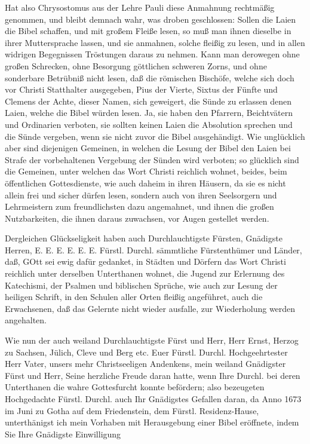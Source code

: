 Hat also Chrysostomus aus der Lehre Pauli diese Anmahnung rechtmäßig genommen, und bleibt demnach wahr, was droben geschlossen: Sollen die Laien die Bibel schaffen, und mit großem Fleiße lesen, so muß man ihnen dieselbe in ihrer Muttersprache lassen, und sie anmahnen, solche fleißig zu lesen, und in allen widrigen Begegnissen Tröstungen daraus zu nehmen. Kann man derowegen ohne großen Schrecken, ohne Besorgung göttlichen schweren Zorns, und ohne sonderbare Betrübniß nicht lesen, daß die römischen Bischöfe, welche sich doch vor Christi Statthalter ausgegeben, Pius der Vierte, Sixtus der Fünfte und Clemens der Achte, dieser Namen, sich geweigert, die Sünde zu erlassen denen Laien, welche die Bibel würden lesen. Ja, sie haben den Pfarrern, Beichtvätern und Ordinarien verboten, sie sollten keinen Laien die Absolution sprechen und die Sünde vergeben, wenn sie nicht zuvor die Bibel ausgehändigt. Wie unglücklich aber sind diejenigen Gemeinen, in welchen die Lesung der Bibel den Laien bei Strafe der vorbehaltenen Vergebung der Sünden wird verboten; so glücklich sind die Gemeinen, unter welchen das Wort Christi reichlich wohnet, beides, beim öffentlichen Gottesdienste, wie auch daheim in ihren Häusern, da sie es nicht allein frei und sicher dürfen lesen, sondern auch von ihren Seelsorgern und Lehrmeistern zum freundlichsten dazu angemahnet, und ihnen die großen Nutzbarkeiten, die ihnen daraus zuwachsen, vor Augen gestellet werden.

Dergleichen Glückseligkeit haben auch Durchlauchtigste Fürsten, Gnädigste Herren, E. E. E. E. E. E. Fürstl. Durchl. sämmtliche Fürstenthümer und Länder, daß, GOtt sei ewig dafür gedanket, in Städten und Dörfern das Wort Christi reichlich unter derselben Unterthanen wohnet, die Jugend zur Erlernung des Katechismi, der Psalmen und biblischen Sprüche, wie auch zur Lesung der heiligen Schrift, in den Schulen aller Orten fleißig angeführet, auch die Erwachsenen, daß das Gelernte nicht wieder ausfalle, zur Wiederholung werden angehalten.

Wie nun der auch weiland Durchlauchtigste Fürst und Herr, Herr Ernst, Herzog zu Sachsen, Jülich, Cleve und Berg etc. Euer Fürstl. Durchl. Hochgeehrtester Herr Vater, unsers mehr Christseeligen Andenkens, mein weiland Gnädigster Fürst und Herr, Seine herzliche Freude daran hatte, wenn Ihre Durchl. bei deren Unterthanen die wahre Gottesfurcht konnte befördern; also bezeugeten Hochgedachte Fürstl. Durchl. auch Ihr Gnädigstes Gefallen daran, da Anno 1673 im Juni zu Gotha auf dem Friedenstein, dem Fürstl. Residenz-Hause, unterthänigst ich mein Vorhaben mit Herausgebung einer Bibel eröffnete, indem Sie Ihre Gnädigste Einwilligung

